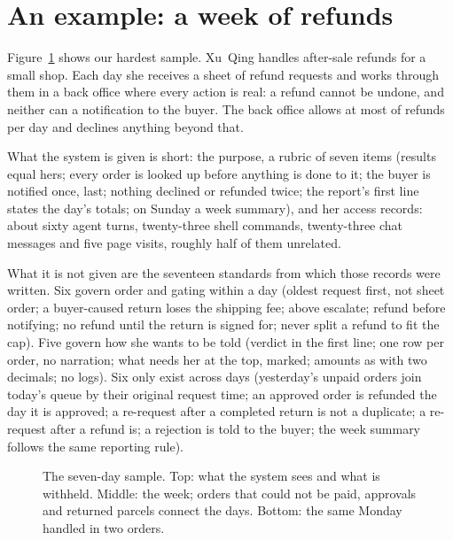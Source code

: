 \documentclass[10pt]{article}
\begin{document}
\section{An example: a week of refunds}
\label{sec:example}

Figure~\ref{fig:week} shows our hardest sample. Xu~Qing handles after-sale refunds for a small shop. Each day she
receives a sheet of refund requests and works through them in a back office where every action is real: a refund
cannot be undone, and neither can a notification to the buyer. The back office allows at most  of
refunds per day and declines anything beyond that.

What the system is given is short: the purpose, a rubric of seven items (results equal hers; every order is looked
up before anything is done to it; the buyer is notified once, last; nothing declined or refunded twice; the report's
first line states the day's totals; on Sunday a week summary), and her access records: about sixty agent turns,
twenty-three shell commands, twenty-three chat messages and five page visits, roughly half of them unrelated.

What it is not given are the seventeen standards from which those records were written. Six govern order and
gating within a day (oldest request first, not sheet order; a buyer-caused return loses the shipping fee; above
 escalate; refund before notifying; no refund until the return is signed for; never split a refund to
fit the cap). Five govern how she wants to be told (verdict in the first line; one row per order, no narration;
what needs her at the top, marked; amounts as \textyen{} with two decimals; no logs). Six only exist across days
(yesterday's unpaid orders join today's queue by their original request time; an approved order is refunded the
day it is approved; a re-request after a completed return is not a duplicate; a re-request after a refund is; a
rejection is told to the buyer; the week summary follows the same reporting rule).

\begin{figure}[t]
\centering

\caption{The seven-day sample. Top: what the system sees and what is withheld. Middle: the week; orders that could
not be paid, approvals and returned parcels connect the days. Bottom: the same Monday handled in two orders.}
\label{fig:week}
\end{figure}
\end{document}
